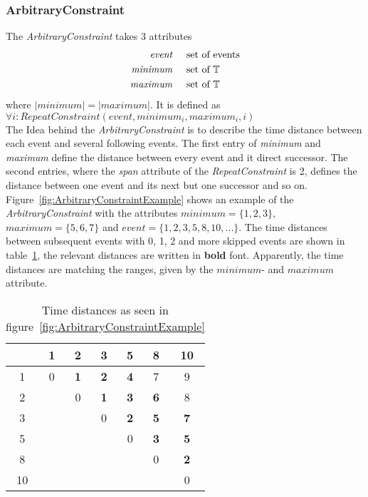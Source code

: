 	\subsubsection{ArbitraryConstraint}
		The \emph{ArbitraryConstraint} takes 3 attributes
		\begin{align*}
			\emph{event} 	& \hspace{.5cm}\text{set of events}\\
			\emph{minimum}	& \hspace{.5cm}\text{set of }\mathbb{T}\\
			\emph{maximum}	& \hspace{.5cm}\text{set of }\mathbb{T}
		\end{align*}
		where $|minimum|=|maximum|$. It is defined as \\[10pt]
		\begin{math}
			\forall i: RepeatConstraint(event, minimum_i, maximum_i, i)
		\end{math}\\[10pt]
		The Idea behind the \emph{ArbitraryConstraint} is to describe the time distance between each event and several following events. The first entry of \emph{minimum} and \emph{maximum} define the distance between every event and it direct successor. The second entries, where the \emph{span} attribute of the  \emph{RepeatConstraint} is 2, defines the distance between one event and its next but one successor and so on.\\
		Figure~\ref{fig:ArbitraryConstraintExample} shows an example of the \emph{ArbitraryConstraint} with the attributes $minimum=\{1,2,3\}$, $maximum=\{5,6,7\}$ and $event=\{1, 2, 3, 5, 8, 10, ...\}$. The time distances between subsequent events with 0, 1, 2 and more skipped events are shown in table~\ref{tab:ArbitraryConstraintExampleTable}, the relevant distances are written in \textbf{bold} font. Apparently, the time distances are matching the ranges, given by the $minimum$- and $maximum$ attribute.\\
		\begin{table}
			\begin{tabular}{|c|c|c|c|c|c|c|}
				\hline
				& 1 & 2 & 3 & 5 & 8 & 10 \\
				\hline
				1 & 0 & \textbf{1} & \textbf{2} & \textbf{4} & 7 & 9 \\
				\hline
				2 &  & 0 & \textbf{1} & \textbf{3} & \textbf{6} & 8 \\
				\hline
				3 &  &  & 0 & \textbf{2} & \textbf{5} & \textbf{7} \\
				\hline
				5 &  &  &  & 0 & \textbf{3} & \textbf{5} \\
				\hline
				8 &  &  &  &  & 0 & \textbf{2} \\
				\hline
				10 &  &  &  &  &  & 0 \\
				\hline
			\end{tabular}
			\centering
			\caption{Time distances as seen in figure~\ref{fig:ArbitraryConstraintExample}}
			\label{tab:ArbitraryConstraintExampleTable}
		\end{table}

